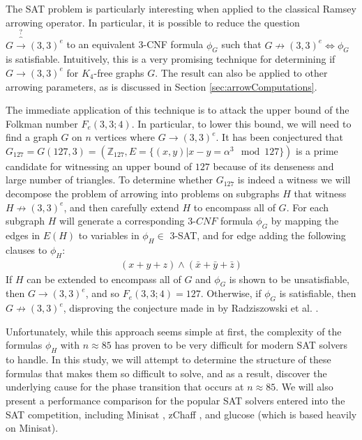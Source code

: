 \documentclass[paper=a4, fontsize=11pt]{scrartcl} %
\begin{document}
The SAT problem is particularly interesting when applied to the classical Ramsey arrowing operator. 
In particular, it is possible to reduce the question $G \overbrace{\to}^\text{?} (3,3)^e$ to an equivalent 3-CNF formula
$\phi_G$ such that $G \not \to (3,3)^e \Leftrightarrow \phi_G$ is satisfiable. Intuitively, this is a very promising
technique for determining if $G \to (3,3)^e$ for $K_4$-free graphs $G$. The result can also be applied
to other arrowing parameters, as is discussed in Section \ref{sec:arrowComputations}.

The immediate application of this technique is to attack the upper bound of the Folkman number
$F_e(3,3;4)$. In particular, to lower this bound, we will need to find a 
graph $G$ on $n$ vertices where $G \to (3,3)^e$. It has been conjectured that 
$G_{127} = G(127,3) = (\mathbb{Z}_{127}, E = \{(x,y) | x - y = \alpha^3 \mod 127\})$ is a
prime candidate for witnessing an upper bound of $127$ because of its denseness and large number
of triangles. To determine whether $G_{127}$ is indeed a witness we will decompose 
the problem of arrowing into problems on subgraphs $H$ that witness $H \not \to (3,3)^e$, 
and then carefully extend $H$ to encompass all of $G$. For each subgraph $H$ will generate
a corresponding $3$-$CNF$ formula $\phi_G$ by mapping the edges in $E(H)$ to variables 
in $\phi_H \in$ 3-SAT, and for edge adding the following clauses to $\phi_H$:
\begin{align*}
(x + y + z) \wedge (\bar{x} + \bar{y} + \bar{z})
\end{align*}
If $H$ can be extended to encompass all of $G$ and $\phi_G$ is 
shown to be unsatisfiable, then $G \to (3,3)^e$, and so $F_e(3,3;4) = 127$.
Otherwise, if $\phi_G$ is satisfiable, then $G \not \to (3,3)^e$, disproving the
conjecture made in by Radziszowski et al. \cite{Radziszowski07-1}.

Unfortunately, while this approach seems simple at first, the complexity of the formulas
$\phi_H$ with $n \approx 85$ has proven to be very difficult for modern SAT solvers
to handle. In this study, we will attempt to determine the structure of these formulas
that makes them so difficult to solve, and as a result, discover the underlying
cause for the phase transition that occurs at $n \approx 85$. 
We will also present a performance comparison for the popular 
SAT solvers entered into the SAT competition, including Minisat \cite{minisat}, 
zChaff \cite{chaff, zchaff}, and glucose \cite{Audemard09-1} (which is based heavily on Minisat). 
\end{document}

